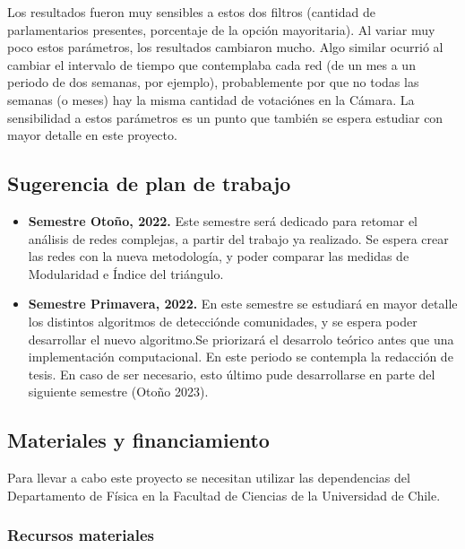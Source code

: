 \documentclass{proyectotesis}
\begin{document}
Los resultados fueron muy sensibles a estos dos filtros (cantidad de parlamentarios presentes, porcentaje de la opción mayoritaria). Al variar muy poco estos parámetros, los resultados cambiaron mucho. Algo similar ocurrió al cambiar el intervalo de tiempo que contemplaba cada red (de un mes a un periodo de dos semanas, por ejemplo), probablemente por que no todas las semanas (o meses) hay la misma cantidad de votaciónes en la Cámara. La sensibilidad a estos parámetros es un punto que también se espera estudiar con mayor detalle en este proyecto. 



\subsection{Sugerencia de plan de trabajo}
\begin{itemize}
\item \textbf{Semestre Otoño, 2022.} Este semestre será dedicado para retomar el análisis de redes complejas, a partir del trabajo ya realizado. Se espera crear las redes con la nueva metodología, y poder comparar las medidas de Modularidad e Índice del triángulo.

\item \textbf{Semestre Primavera, 2022.} En este semestre se estudiará en mayor detalle los distintos algoritmos de detecciónde comunidades, y se espera poder desarrollar el nuevo algoritmo.Se priorizará el desarrolo teórico antes que una implementación computacional.
En este periodo se contempla la redacción de tesis. En caso de ser necesario, esto último pude desarrollarse en parte del siguiente semestre (Otoño 2023). 
\end{itemize}

\subsection{Materiales y financiamiento}

Para llevar a cabo este proyecto se necesitan utilizar las dependencias del Departamento de Física en la Facultad de Ciencias de la Universidad de Chile. %

\subsubsection*{Recursos materiales}
\end{document}
